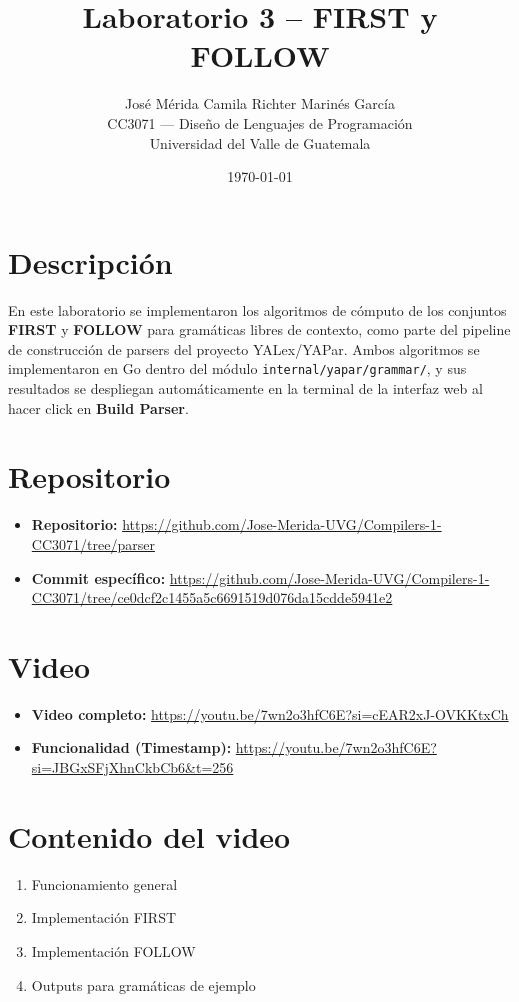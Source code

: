 \documentclass[12pt]{article}
\title{\textbf{Laboratorio 3 -- FIRST y FOLLOW}}
\author{José Mérida \quad Camila Richter \quad Marinés García\\[0.5em]CC3071 --- Diseño de Lenguajes de Programación\\Universidad del Valle de Guatemala}
\date{\today}
\begin{document}
\maketitle

\section{Descripción}

En este laboratorio se implementaron los algoritmos de cómputo de los conjuntos \textbf{FIRST} y \textbf{FOLLOW} para
gramáticas libres de contexto, como parte del pipeline de construcción de parsers del proyecto YALex/YAPar. Ambos
algoritmos se implementaron en Go dentro del módulo \texttt{internal/yapar/grammar/}, y sus resultados se despliegan
automáticamente en la terminal de la interfaz web al hacer click en \textbf{Build Parser}.

\section{Repositorio}

\begin{itemize}
  \item \textbf{Repositorio:} \url{https://github.com/Jose-Merida-UVG/Compilers-1-CC3071/tree/parser}
  \item \textbf{Commit específico:} \url{https://github.com/Jose-Merida-UVG/Compilers-1-CC3071/tree/ce0dcf2c1455a5c6691519d076da15cdde5941e2}
\end{itemize}

\section{Video}

\begin{itemize}
  \item \textbf{Video completo:} \url{https://youtu.be/7wn2o3hfC6E?si=cEAR2xJ-OVKKtxCh}
  \item \textbf{Funcionalidad (Timestamp):} \url{https://youtu.be/7wn2o3hfC6E?si=JBGxSFjXhnCkbCb6&t=256}
\end{itemize}

\section{Contenido del video}

\begin{enumerate}
  \item Funcionamiento general
  \item Implementación FIRST
  \item Implementación FOLLOW
  \item Outputs para gramáticas de ejemplo
\end{enumerate}
\end{document}
